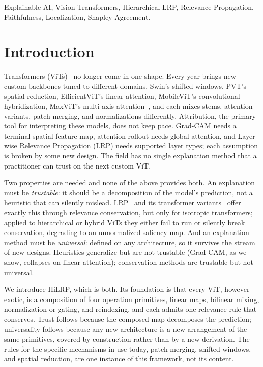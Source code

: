 \documentclass[lettersize,journal]{IEEEtran}
\begin{document}
\begin{IEEEkeywords}
Explainable AI, Vision Transformers, Hierarchical LRP, Relevance Propagation,
Faithfulness, Localization, Shapley Agreement.
\end{IEEEkeywords}

\section{Introduction}
\label{sec:introduction}
 Transformers (ViTs)~\cite{dosovitskiy2021vit} no longer come in one shape. Every year brings new custom backbones tuned to different domains, Swin's shifted windows, PVT's spatial reduction, EfficientViT's linear attention, MobileViT's convolutional hybridization, MaxViT's multi-axis attention~\cite{liu2021swin,wang2021pvt,cai2023efficientvit}, and each mixes stems, attention variants, patch merging, and normalizations differently. Attribution, the primary tool for interpreting these models, does not keep pace. Grad-CAM needs a terminal spatial feature map, attention rollout needs global attention, and Layer-wise Relevance Propagation (LRP) needs supported layer types; each assumption is broken by some new design. The field has no single explanation method that a practitioner can trust on the next custom ViT.

Two properties are needed and none of the above provides both. An explanation must be \emph{trustable}: it should be a decomposition of the model's prediction, not a heuristic that can silently mislead. LRP~\cite{bach2015lrp} and its transformer variants~\cite{chefer2021transformer,achtibat2024attnlrp} offer exactly this through relevance conservation, but only for isotropic transformers; applied to hierarchical or hybrid ViTs they either fail to run or silently break conservation, degrading to an unnormalized saliency map. And an explanation method must be \emph{universal}: defined on any architecture, so it survives the stream of new designs. Heuristics generalize but are not trustable (Grad-CAM, as we show, collapses on linear attention); conservation methods are trustable but not universal.

We introduce HiLRP, which is both. Its foundation is that every ViT, however exotic, is a composition of four operation primitives, linear maps, bilinear mixing, normalization or gating, and reindexing, and each admits one relevance rule that conserves. Trust follows because the composed map decomposes the prediction; universality follows because any new architecture is a new arrangement of the same primitives, covered by construction rather than by a new derivation. The rules for the specific mechanisms in use today, patch merging, shifted windows, and spatial reduction, are one instance of this framework, not its content.
\end{document}
